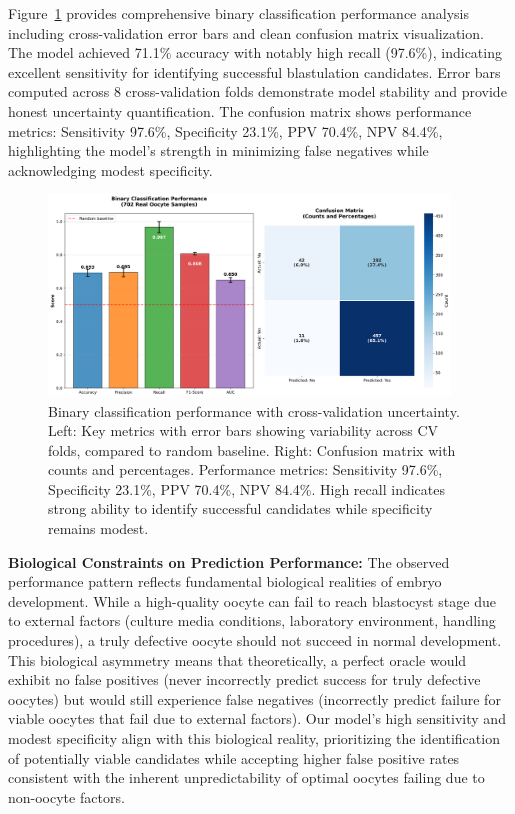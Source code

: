Figure~\ref{fig:oocyte_metrics} provides comprehensive binary classification performance analysis including cross-validation error bars and clean confusion matrix visualization. The model achieved 71.1\% accuracy with notably high recall (97.6\%), indicating excellent sensitivity for identifying successful blastulation candidates. Error bars computed across 8 cross-validation folds demonstrate model stability and provide honest uncertainty quantification. The confusion matrix shows performance metrics: Sensitivity 97.6\%, Specificity 23.1\%, PPV 70.4\%, NPV 84.4\%, highlighting the model's strength in minimizing false negatives while acknowledging modest specificity.

\begin{figure}[H]
    \centering
    \includegraphics[width=0.95\textwidth]{figures/oocyte_classification_metrics.png}
    \caption{Binary classification performance with cross-validation uncertainty. Left: Key metrics with error bars showing variability across CV folds, compared to random baseline. Right: Confusion matrix with counts and percentages. Performance metrics: Sensitivity 97.6\%, Specificity 23.1\%, PPV 70.4\%, NPV 84.4\%. High recall indicates strong ability to identify successful candidates while specificity remains modest.}
    \label{fig:oocyte_metrics}
\end{figure}

\textbf{Biological Constraints on Prediction Performance:} The observed performance pattern reflects fundamental biological realities of embryo development. While a high-quality oocyte can fail to reach blastocyst stage due to external factors (culture media conditions, laboratory environment, handling procedures), a truly defective oocyte should not succeed in normal development. This biological asymmetry means that theoretically, a perfect oracle would exhibit no false positives (never incorrectly predict success for truly defective oocytes) but would still experience false negatives (incorrectly predict failure for viable oocytes that fail due to external factors). Our model's high sensitivity and modest specificity align with this biological reality, prioritizing the identification of potentially viable candidates while accepting higher false positive rates consistent with the inherent unpredictability of optimal oocytes failing due to non-oocyte factors.

